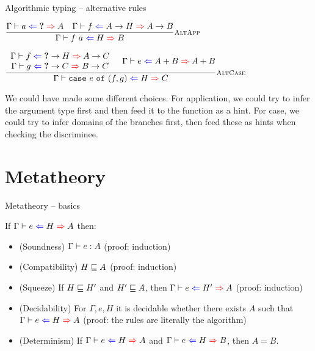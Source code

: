 \documentclass{beamer}
\begin{document}
\begin{frame}{Algorithmic typing -- alternative rules}

\begin{center}
  $\infrule[AltApp]{\hinting{a}{\Hole}{A} \quad \hinting{f}{\Fun{A}{H}}{\Fun{A}{B}}}{\hinting{\app{f}{a}}{H}{B}}$

  \vspace{2em}

  $\infrule[AltCase]{\begin{array}{c} \hinting{f}{\Fun{\Hole}{H}}{\Fun{A}{C}} \\ \hinting{g}{\Fun{\Hole}{C}}{\Fun{B}{C}} \end{array} \quad \hinting{e}{\Sum{A}{B}}{\Sum{A}{B}}}{\hinting{\case{e}{f}{g}}{H}{C}}$
\end{center}

\vspace{2em}

We could have made some different choices. For application, we could try to infer the argument type first and then feed it to the function as a hint. For case, we could try to infer domains of the branches first, then feed these as hints when checking the discriminee.

\end{frame}

\section{Metatheory}

\begin{frame}{Metatheory -- basics}

If $\fullhinting{\Gamma}{e}{H}{A}$ then:

\begin{itemize}
  \item (Soundness) $\Gamma \vdash e : A$ (proof: induction)
  \item (Compatibility) $H \sqsubseteq A$ (proof: induction)
  \item (Squeeze) If $H \sqsubseteq H'$ and $H' \sqsubseteq A$, then $\fullhinting{\Gamma}{e}{H'}{A}$ (proof: induction)
  \item (Decidability) For $\Gamma, e, H$ it is decidable whether there exists $A$ such that $\fullhinting{\Gamma}{e}{H}{A}$ (proof: the rules are literally the algorithm)
  \item (Determinism) If $\hinting{e}{H}{A}$ and $\hinting{e}{H}{B}$, then $A = B$.
\end{itemize}

\end{frame}
\end{document}
